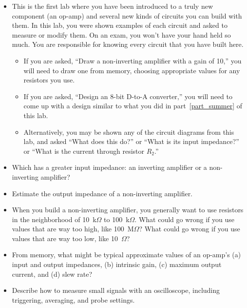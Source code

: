 \begin{itemize}

\item This is the first lab where you have been introduced to a truly new component (an op-amp) and several new kinds of circuits you can build with them.  In this lab, you were shown examples of each circuit and asked to measure or modify them.  On an exam, you won't have your hand held so much.  You are responsible for knowing every circuit that you have built here.

\begin{itemize}
\item If you are asked, ``Draw a non-inverting amplifier with a gain of 10,'' you will need to draw one from memory, choosing appropriate values for any resistors you use.

\item If you are asked, ``Design an 8-bit D-to-A converter,'' you will need to come up with a design similar to what you did in part~\ref{part_summer} of this lab.

\item Alternatively, you may be shown any of the circuit diagrams from this lab, and asked ``What does this do?'' or ``What is its input impedance?'' or ``What is the current through resistor $R_2$.''
\end{itemize}

\item Which has a greater input impedance: an inverting amplifier or a non-inverting amplifier?

\item Estimate the output impedance of a non-inverting amplifier.

\item When you build a non-inverting amplifier, you generally want to use resistors in the neighborhood of 10~k$\Omega$ to 100~k$\Omega$.  What could go wrong if you use values that are way too high, like 100~M$\Omega$?  What could go wrong if you use values that are way too low, like 10~$\Omega$?

\item From memory, what might be typical approximate values of an op-amp's (a) input and output impedances, (b) intrinsic gain, (c) maximum output current, and (d) slew rate?  

\item Describe how to measure small signals with an oscilloscope, including triggering, averaging, and probe settings.


\end{itemize}







